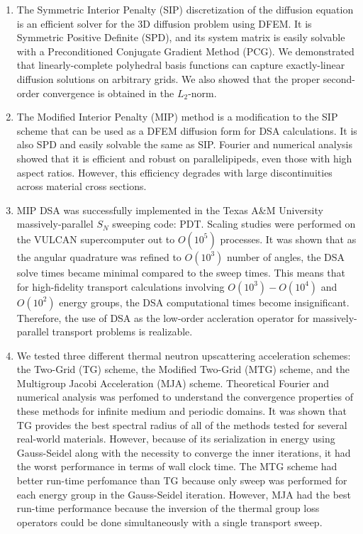 \begin{enumerate}
\item The Symmetric Interior Penalty (SIP) discretization of the diffusion equation is an efficient solver for the 3D diffusion problem using DFEM. It is Symmetric Positive Definite (SPD), and its system matrix is easily solvable with a Preconditioned Conjugate Gradient Method (PCG). We demonstrated that linearly-complete polyhedral basis functions can capture exactly-linear diffusion solutions on arbitrary grids. We also showed that the proper second-order convergence is obtained in the $L_2$-norm.
\item The Modified Interior Penalty (MIP) method is a modification to the SIP scheme that can be used as a DFEM diffusion form for DSA calculations. It is also SPD and easily solvable the same as SIP. Fourier and numerical analysis showed that it is efficient and robust on parallelipipeds, even those with high aspect ratios. However, this efficiency degrades with large discontinuities across material cross sections.
\item MIP DSA was successfully implemented in the Texas A\&M University massively-parallel $S_N$ sweeping code: PDT. Scaling studies were performed on the VULCAN supercomputer out to $O(10^5)$ processes. It was shown that as the angular quadrature was refined to $O(10^3)$ number of angles, the DSA solve times became minimal compared to the sweep times. This means that for high-fidelity transport calculations involving $O(10^3) - O(10^4)$ and $O(10^2)$ energy groups, the DSA computational times become insignificant. Therefore, the use of DSA as the low-order accleration operator for massively-parallel transport problems is realizable.
\item We tested three different thermal neutron upscattering acceleration schemes: the Two-Grid (TG) scheme, the Modified Two-Grid (MTG) scheme, and the Multigroup Jacobi Acceleration (MJA) scheme. Theoretical Fourier and numerical analysis was perfomed to understand the convergence properties of these methods for infinite medium and periodic domains. It was shown that TG provides the best spectral radius of all of the methods tested for several real-world materials. However, because of its serialization in energy using Gauss-Seidel along with the necessity to converge the inner iterations, it had the worst performance in terms of wall clock time. The MTG scheme had better run-time perfomance than TG because only sweep was performed for each energy group in the Gauss-Seidel iteration. However, MJA had the best run-time performance because the inversion of the thermal group loss operators could be done simultaneously with a single transport sweep.
\end{enumerate}

